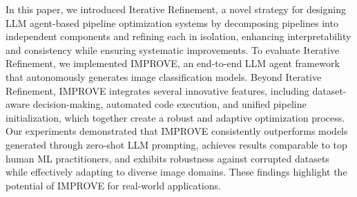 \label{sec:conclusion}
In this paper, we introduced Iterative Refinement, a novel strategy for designing LLM agent-based pipeline optimization systems by decomposing pipelines into independent components and refining each in isolation, enhancing interpretability and consistency while ensuring systematic improvements. To evaluate Iterative Refinement, we implemented IMPROVE, an end-to-end LLM agent framework that autonomously generates image classification models. Beyond Iterative Refinement, IMPROVE integrates several innovative features, including dataset-aware decision-making, automated code execution, and unified pipeline initialization, which together create a robust and adaptive optimization process. Our experiments demonstrated that IMPROVE consistently outperforms models generated through zero-shot LLM prompting, achieves results comparable to top human ML practitioners, and exhibits robustness against corrupted datasets while effectively adapting to diverse image domains. These findings highlight the potential of IMPROVE for real-world applications.